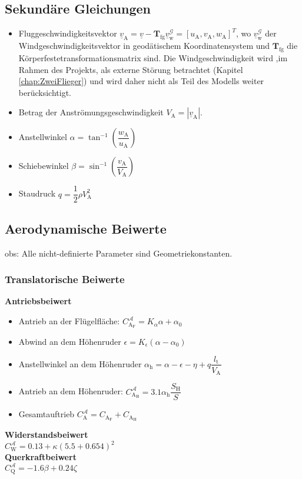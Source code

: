 \documentclass[10pt,a4paper]{article}
\begin{document}
\subsection{Sekundäre Gleichungen}
\label{sec:Anströmung}
\begin{itemize}
\item Fluggeschwindigkeitsvektor $\underline{v}_\mathrm{A} = \underline{v}- \textbf{T}_\mathrm{fg}\underline{v}^\mathcal{G}_\mathrm{w}  = [u_\mathrm{A},v_\mathrm{A},w_\mathrm{A}]^T $, wo $\underline{v}^\mathcal{G}_\mathrm{w}$ der Windgeschwindigkeitsvektor in geodätischem Koordinatensystem und $\textbf{T}_\mathrm{fg}$ die Körperfestetransformationsmatrix sind. Die Windgeschwindigkeit wird ,im Rahmen des Projekts, als externe Störung betrachtet (Kapitel \ref{chap:ZweiFlieger}) und wird daher nicht als Teil des Modells weiter berücksichtigt.  
\item Betrag der Anströmungsgeschwindigkeit $V_\mathrm{A} = |\underline{v}_\mathrm{A}| $.
\item Anstellwinkel $\alpha = \tan^{-1}(\dfrac{w_\mathrm{A}}{u_\mathrm{A}})$
\item Schiebewinkel $\beta = \sin^{-1}(\dfrac{v_\mathrm{A}}{V_\mathrm{A}})$
\item Staudruck $q = \dfrac{1}{2}\rho V_\mathrm{A}^2$

\end{itemize}
\subsection{Aerodynamische Beiwerte}
obs: Alle nicht-definierte Parameter sind Geometriekonstanten.\\

\subsubsection{Translatorische Beiwerte}
\textbf{Antriebsbeiwert}\\

\begin{itemize}
\item Antrieb an der Flügelfläche: $C_\mathrm{A_F}^\mathcal{A} = K_\alpha\alpha + \alpha_0$
\item Abwind an dem Höhenruder $\epsilon = K_{\epsilon}(\alpha-\alpha_\mathrm{0})$
\item Anstellwinkel an dem Höhenruder $\alpha_\mathrm{h} = \alpha - \epsilon-\eta + q\dfrac{l_\mathrm{t}}{V_\mathrm{A}}$
\item Antrieb an dem Höhenruder: $C_\mathrm{A_H}^\mathcal{A} = 3.1 \alpha_\mathrm{h}\dfrac{S_\mathrm{H}}{S}$
\item Gesamtauftrieb $C_\mathrm{A}^\mathcal{A} = C_\mathrm{A_F}+C_\mathrm{A_H} $
\end{itemize}
\textbf{Widerstandsbeiwert}\\
$C_\mathrm{W}^\mathcal{A} = 0.13 + \kappa(5.5+0.654)^2$\\
\textbf{Querkraftbeiwert}\\
$C_\mathrm{Q}^\mathcal{A} = -1.6\beta + 0.24\zeta$
\end{document}
